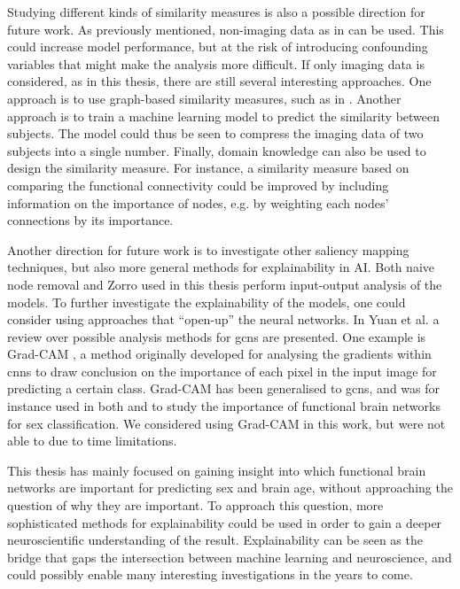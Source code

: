 Studying different kinds of similarity measures is also a possible direction for future work. As previously mentioned, non-imaging data as in \cite{stankeviciute} can be used. This could increase model performance, but at the risk of introducing confounding variables that might make the analysis more difficult. If only imaging data is considered, as in this thesis, there are still several interesting approaches. One approach is to use graph-based similarity measures, such as in \cite{higcn}. Another approach is to train a machine learning model to predict the similarity between subjects. The model could thus be seen to compress the imaging data of two subjects into a single number. Finally, domain knowledge can also be used to design the similarity measure. For instance, a similarity measure based on comparing the functional connectivity could be improved by including information on the importance of nodes, e.g. by weighting each nodes' connections by its importance. 

Another direction for future work is to investigate other saliency mapping techniques, but also more general methods for explainability in AI. Both naive node removal and Zorro used in this thesis perform input-output analysis of the models. To further investigate the explainability of the models, one could consider using approaches that ``open-up'' the neural networks. In Yuan et al. \cite{yuan_survey} a review over possible analysis methods for \acrshort{gcn}s are presented. One example is Grad-CAM \cite{gradcam}, a method originally developed for analysing the gradients within \acrshort{cnn}s to draw conclusion on the importance of each pixel in the input image for predicting a certain class. Grad-CAM has been generalised to \acrshort{gcn}s, and was for instance used in both \cite{arslan} and \cite{understanding_gnn} to study the importance of functional brain networks for sex classification. We considered using Grad-CAM in this work, but were not able to due to time limitations. 

This thesis has mainly focused on gaining insight into which functional brain networks are important for predicting sex and brain age, without approaching the question of why they are important. To approach this question, more sophisticated methods for explainability could be used in order to gain a deeper neuroscientific understanding of the result. Explainability can be seen as the bridge that gaps the intersection between machine learning and neuroscience, and could possibly enable many interesting investigations in the years to come.

